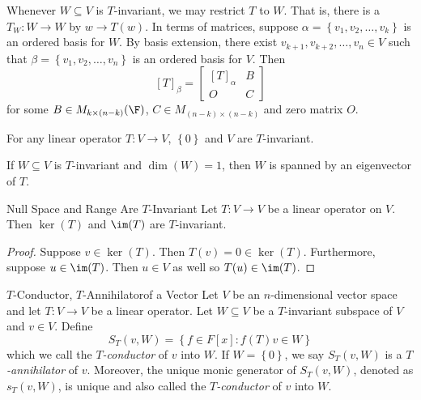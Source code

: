 \documentclass[math_245.tex]{subfiles}
\begin{document}
    \begin{remark}
        Whenever $W\subseteq V$ is $T$-invariant, we may restrict $T$ to $W$. That is, there is a $T_W:W\to W$ by $w\to T(w)$. In terms of matrices, suppose $\alpha = \left\lbrace v_1, v_2, \ldots, v_k \right\rbrace$ is an ordered basis for $W$. By basis extension, there exist $v_{k+1}, v_{k+2}, \ldots, v_n\in V$ such that $\beta = \left\lbrace v_1, v_2, \ldots, v_n \right\rbrace$ is an ordered basis for $V$. Then
        \begin{equation*}
            \left[ T \right]_\beta = \begin{bmatrix} [T]_\alpha & B \\ O & C \end{bmatrix}
        \end{equation*}
        for some $B\in M_{k\times (n-k)}(\F)$, $C\in M_{(n-k)\times (n-k)}$ and zero matrix $O$.
    \end{remark}

    \begin{remark}
        For any linear operator $T:V\to V$, $\left\lbrace 0 \right\rbrace$ and $V$ are $T$-invariant.
    \end{remark}

    \begin{remark}
        If $W\subseteq V$ is $T$-invariant and $\dim(W) = 1$, then $W$ is spanned by an eigenvector of $T$.
    \end{remark}

    \begin{prop}{Null Space and Range Are $T$-Invariant}
        Let $T:V\to V$ be a linear operator on $V$. Then $\ker(T)$ and $\im(T)$ are $T$-invariant.
    \end{prop}

    \begin{proof}
        Suppose $v\in \ker(T)$. Then $T(v) = 0 \in \ker(T)$. Furthermore, suppose $u\in \im(T)$. Then $u\in V$ as well so $T(u)\in \im(T)$.
    \end{proof}

    \begin{definition}{$T$-Conductor, $T$-Annihilator}{of a Vector}
        Let $V$ be an $n$-dimensional vector space and let $T:V\to V$ be a linear operator. Let $W\subseteq V$ be a $T$-invariant subspace of $V$ and $v\in V$. Define
        \begin{equation*}
            S_T (v, W) = \left\lbrace f\in F[x]: f(T)v \in W \right\rbrace
        \end{equation*}
        which we call the \emph{$T$-conductor} of $v$ into $W$. If $W = \left\lbrace 0 \right\rbrace$, we say $S_T(v, W)$ is a \emph{$T$-annihilator} of $v$. Moreover, the unique monic generator of $S_T(v, W)$, denoted as $s_T(v, W)$, is unique and also called the \emph{$T$-conductor} of $v$ into $W$.
    \end{definition}
\end{document}
